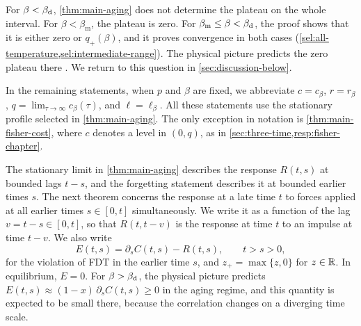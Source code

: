 For $\beta<\beta_{\mathrm d}$, \cref{thm:main-aging} does not determine the plateau on the whole interval. For $\beta<\beta_{\mathrm m}$, the plateau is zero. For $\beta_{\mathrm m}\le\beta<\beta_{\mathrm d}$, the proof shows that it is either zero or $q_+(\beta)$, and it proves convergence in both cases (\cref{sel:all-temperature,sel:intermediate-range}). The physical picture predicts the zero plateau there \cite{ck1993,chs1993}. We return to this question in \cref{sec:discussion-below}.

In the remaining statements, when $p$ and $\beta$ are fixed, we abbreviate $c=c_\beta$, $r=r_\beta$, $q=\lim_{\tau\to\infty}c_\beta(\tau)$, and $\ell=\ell_\beta$. All these statements use the stationary profile selected in \cref{thm:main-aging}. The only exception in notation is \cref{thm:main-fisher-cost}, where $c$ denotes a level in $(0,q)$, as in \cref{sec:three-time,resp:fisher-chapter}.

The stationary limit in \cref{thm:main-aging} describes the response $R(t,s)$ at bounded lags $t-s$, and the forgetting statement describes it at bounded earlier times $s$. The next theorem concerns the response at a late time $t$ to forces applied at all earlier times $s\in[0,t]$ simultaneously. We write it as a function of the lag $v=t-s\in[0,t]$, so that $R(t,t-v)$ is the response at time $t$ to an impulse at time $t-v$. We also write
\[
 E(t,s)=\partial_sC(t,s)-R(t,s),\qquad t>s>0,
\]
for the violation of FDT in the earlier time $s$, and $z_+=\max\{z,0\}$ for $z\in\mathbb R$. In equilibrium, $E=0$. For $\beta>\beta_{\mathrm d}$, the physical picture predicts $E(t,s)\approx(1-x)\,\partial_sC(t,s)\ge0$ in the aging regime, and this quantity is expected to be small there, because the correlation changes on a diverging time scale.

